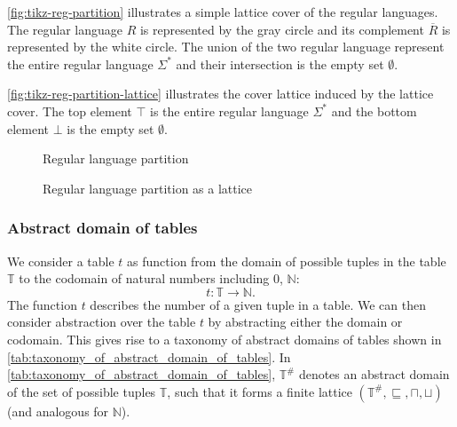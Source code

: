 \begin{example}
    \autoref{fig:tikz-reg-partition} illustrates a simple lattice cover of the regular languages.
    The regular language $R$ is represented by the gray circle and its complement $\overline{R}$ is represented by the white circle.
    The union of the two regular language represent the entire regular language $\Sigma^*$ and their intersection is the empty set $\emptyset$.

    \autoref{fig:tikz-reg-partition-lattice} illustrates the cover lattice induced by the lattice cover.
    The top element $\top$ is the entire regular language $\Sigma^*$ and the bottom element $\bot$ is the empty set $\emptyset$.
\end{example}

\begin{figure}
    \center
    \resizebox{7.5cm}{!}{
    }
    \caption{Regular language partition}
    \label{fig:tikz-reg-partition}
\end{figure}

\begin{figure}[!htb]
    \center
    \resizebox{6.5cm}{!}{
    }
    \caption{Regular language partition as a lattice}
    \label{fig:tikz-reg-partition-lattice}
\end{figure}

\subsubsection{Abstract domain of tables}\label{subsubsec:abstract_domain_of_tables}

We consider a table $t$ as function from the domain of possible tuples in the table $\mathbb{T}$ to the codomain of natural numbers including $0$, $\mathbb{N}$:
\begin{equation}
    t : \mathbb{T} \rightarrow \mathbb{N}.
\end{equation}
The function $t$ describes the number of a given tuple in a table.
We can then consider abstraction over the table $t$ by abstracting either the domain or codomain.
This gives rise to a taxonomy of abstract domains of tables shown in \autoref{tab:taxonomy_of_abstract_domain_of_tables}.
In \autoref{tab:taxonomy_of_abstract_domain_of_tables}, $\mathbb{T}^\#$ denotes an abstract domain of the set of possible tuples $\mathbb{T}$, such that it forms a finite lattice $(\mathbb{T}^\#, \sqsubseteq, \sqcap, \sqcup)$ (and analogous for $\mathbb{N}$).


